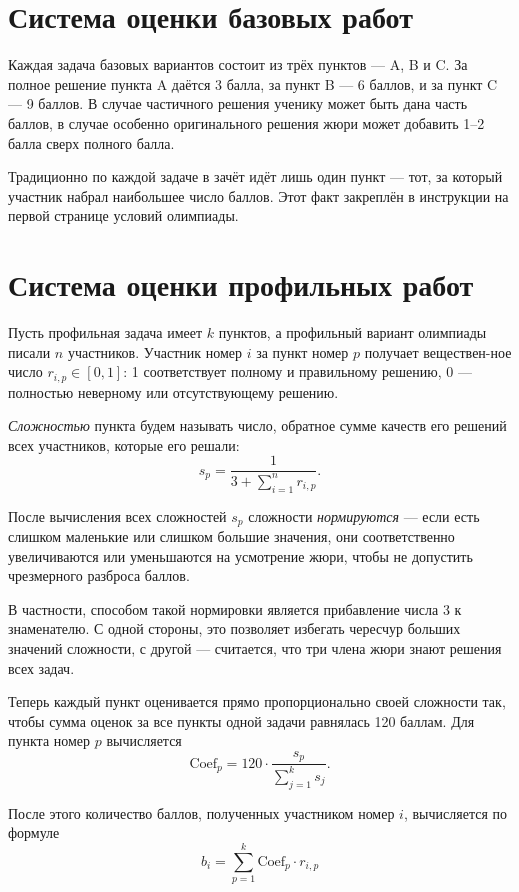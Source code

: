 \documentclass[a4paper,12pt]{article}
\begin{document}
\section{Система оценки базовых работ}

Каждая задача базовых вариантов состоит из трёх пунктов — A, B и C. За полное решение пункта A даётся 3 балла, за пункт B --- 6 баллов, и за пункт C --- 9 баллов. В случае частичного решения ученику может быть дана часть баллов, в случае особенно оригинального решения жюри может добавить 1–2 балла сверх полного балла.

Традиционно по каждой задаче в зачёт идёт лишь один пункт — тот, за который участник набрал наибольшее число баллов. Этот факт закреплён в инструкции на первой странице условий олимпиады.

\section{Система оценки профильных работ}

Пусть профильная задача имеет $k$ пунктов, а профильный вариант олимпиады писали
$n$ участников. Участник номер $i$ за пункт номер $p$ получает веществен-\linebreak ное число
$r_{i,p} \in [0,1]$:
1 соответствует полному и правильному решению, 0 — полностью неверному или отсутствующему решению.

{\it Сложностью} пункта будем называть число, обратное сумме
качеств его решений всех участников, которые его решали:
	$$s_p = \frac{1}{3 + \sum\limits_{i=1}^n r_{i,p}}.$$

После вычисления всех сложностей $s_p$ сложности
{\it нормируются} — если есть слишком маленькие или слишком большие значения, они соответственно
увеличиваются или уменьшаются на усмотрение жюри, чтобы не допустить чрезмерного разброса баллов.

В частности, способом такой нормировки является прибавление числа 3 к знаменателю. С одной стороны,
это позволяет избегать чересчур больших значений сложности, с другой — считается, что три члена жюри
знают решения всех задач.

\def\Coef{\text{Coef}}
Теперь каждый пункт оценивается прямо пропорционально своей сложности так,
чтобы сумма оценок за все пункты одной задачи равнялась 120 баллам. Для пункта номер $p$ вычисляется
	$$\Coef_p = 120 \cdot \frac{s_p}{\sum\limits_{j=1}^{k} s_j}.$$

После этого количество баллов, полученных участником номер $i$, вычисляется по формуле
	$$b_i = \sum\limits_{p=1}^{k} \Coef_p \cdot r_{i,p}$$
\end{document}
